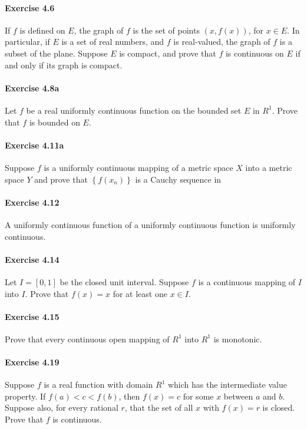 \documentclass{article}
\begin{document}
\paragraph{Exercise 4.6} If $f$ is defined on $E$, the graph of $f$ is the set of points $(x, f(x))$, for $x \in E$. In particular, if $E$ is a set of real numbers, and $f$ is real-valued, the graph of $f$ is a subset of the plane. Suppose $E$ is compact, and prove that $f$ is continuous on $E$ if and only if its graph is compact.

\paragraph{Exercise 4.8a} Let $f$ be a real uniformly continuous function on the bounded set $E$ in $R^{1}$. Prove that $f$ is bounded on $E$.

\paragraph{Exercise 4.11a} Suppose $f$ is a uniformly continuous mapping of a metric space $X$ into a metric space $Y$ and prove that $\left\{f\left(x_{n}\right)\right\}$ is a Cauchy sequence in

\paragraph{Exercise 4.12} A uniformly continuous function of a uniformly continuous function is uniformly continuous.

\paragraph{Exercise 4.14} Let $I=[0,1]$ be the closed unit interval. Suppose $f$ is a continuous mapping of $I$ into $I$. Prove that $f(x)=x$ for at least one $x \in I$.

\paragraph{Exercise 4.15} Prove that every continuous open mapping of $R^{1}$ into $R^{1}$ is monotonic.

\paragraph{Exercise 4.19} Suppose $f$ is a real function with domain $R^{1}$ which has the intermediate value property. If $f(a)<c<f(b)$, then $f(x)=c$ for some $x$ between $a$ and $b$. Suppose also, for every rational $r$, that the set of all $x$ with $f(x)=r$ is closed. Prove that $f$ is continuous.
\end{document}

